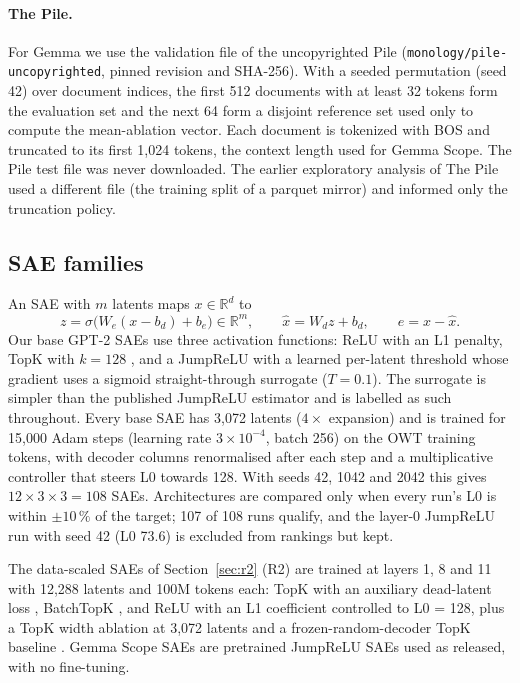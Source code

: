 \paragraph{The Pile.} For Gemma we use the validation file of the uncopyrighted Pile \citep{gao2020pile}
(\texttt{monology/pile-uncopyrighted}, pinned revision and SHA-256). With a seeded permutation (seed 42) over document
indices, the first 512 documents with at least 32 tokens form the evaluation set and the next 64 form a disjoint
reference set used only to compute the mean-ablation vector. Each document is tokenized with BOS and truncated to its
first 1{,}024 tokens, the context length used for Gemma Scope. The Pile test file was never downloaded. The earlier
exploratory analysis of The Pile used a different file (the training split of a parquet mirror) and informed only the
truncation policy.

\subsection{SAE families}\label{sec:saes}

An SAE with $m$ latents maps $x\in\mathbb{R}^d$ to
\begin{equation}
  z=\sigma\big(W_e(x-b_d)+b_e\big)\in\mathbb{R}^m,\qquad \hat{x}=W_d z+b_d,\qquad e=x-\hat{x}.
\end{equation}
Our base GPT-2 SAEs use three activation functions: ReLU with an L1 penalty, TopK with $k=128$ \citep{gao2024scaling},
and a JumpReLU with a learned per-latent threshold whose gradient uses a sigmoid straight-through surrogate
($T=0.1$). The surrogate is simpler than the published JumpReLU estimator \citep{rajamanoharan2024jumping} and is
labelled as such throughout. Every base SAE has 3{,}072 latents ($4\times$ expansion) and is trained for 15{,}000 Adam
steps (learning rate $3\times10^{-4}$, batch 256) on the OWT training tokens, with decoder columns renormalised after
each step and a multiplicative controller that steers L0 towards 128. With seeds 42, 1042 and 2042 this gives
$12\times3\times3=108$ SAEs. Architectures are compared only when every run's L0 is within $\pm10\,\%$ of the target;
107 of 108 runs qualify, and the layer-0 JumpReLU run with seed 42 (L0 73.6) is excluded from rankings but kept.

The data-scaled SAEs of Section~\ref{sec:r2} (R2) are trained at layers 1, 8 and 11 with 12{,}288 latents and 100M
tokens each: TopK with an auxiliary dead-latent loss \citep{gao2024scaling}, BatchTopK \citep{bussmann2024batchtopk},
and ReLU with an L1 coefficient controlled to L0 = 128, plus a TopK width ablation at 3{,}072 latents and a
frozen-random-decoder TopK baseline \citep{korznikov2026random}. Gemma Scope SAEs are pretrained JumpReLU SAEs used as
released, with no fine-tuning.

